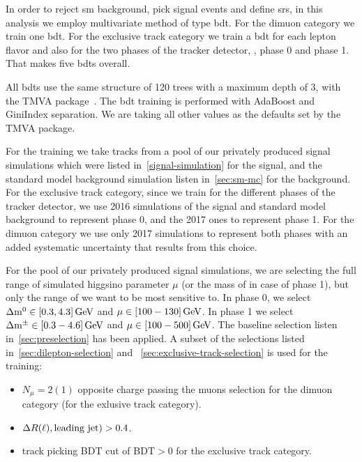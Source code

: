 In order to reject \gls{sm} background, pick signal events and define  \glspl{sr}, in this analysis we employ multivariate method of type \gls{bdt}. For the dimuon category we train one  \gls{bdt}. For the exclusive track category we train a \gls{bdt} for each lepton flavor and also for the two phases of the tracker detector, \ie, phase 0 and phase 1. That makes five \glspl{bdt} overall.

All \glspl{bdt} use the same structure of 120 trees with a maximum depth of 3, with the TMVA package~\cite{tmva}. The \gls{bdt} training is performed with AdaBoost and GiniIndex separation. We are taking all other values as the defaults set by the TMVA package. 

For the training we take tracks from a pool of our privately produced \FASTSIM signal simulations which were listed in~\ref{signal-simulation} for the signal, and the standard model background simulation listen in~\ref{sec:sm-mc} for the background. For the exclusive track category, since we train for the different phases of the tracker detector, we use 2016 simulations of the signal and standard model background to represent phase 0, and the 2017 ones to represent phase 1. For the dimuon category we use only 2017 simulations to represent both phases with an added systematic uncertainty that results from this choice. 

For the pool of our privately produced \FASTSIM signal simulations, we are selecting the full range of simulated higgsino parameter $\mu$ (or the mass of \PSGcpmDo in case of phase 1), but only the range of \dm we want to be most sensitive to. In phase 0, we select $\Delta\mathrm{m}^0\in [0.3,4.3]\,\text{Ge\hspace{-.08em}V}$ and $\mu\in [100-130]\,\text{Ge\hspace{-.08em}V}$. In phase 1 we select $\Delta\mathrm{m}^\pm \in [0.3-4.6]\,\text{Ge\hspace{-.08em}V}$ and $\mu\in [100-500]\,\text{Ge\hspace{-.08em}V}$. The baseline selection listen in~\ref{sec:preselection} has been applied. A subset of the selections listed in~\ref{sec:dilepton-selection} and ~\ref{sec:exclusive-track-selection} is used for the training:

\begin{itemize}

\item $N_\mu = 2 (1)$ opposite charge passing the muons selection for the dimuon category (for the exlusive track category).

\item $\Delta R(\ell),\text{leading jet}) > 0.4$. 

\item track picking BDT cut of $\mathrm{BDT} > 0$ for the exclusive track category.

\end{itemize}

